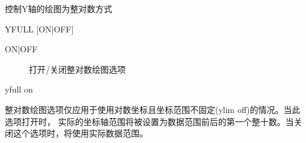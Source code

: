 \label{cmd:yfull}

控制Y轴的绘图为整对数方式

\begin{SACSTX}
YFULL [ON|OFF]
\end{SACSTX}

\begin{description}
\item [ON|OFF] 打开/关闭整对数绘图选项
\end{description}

\begin{SACDFT}
yfull on
\end{SACDFT}

整对数绘图选项仅应用于使用对数坐标且坐标范围不固定(ylim off)的情况。当此选项打开时，
实际的坐标轴范围将被设置为数据范围前后的第一个整十数。当关闭这个选项时，将使用实际数据范围。
